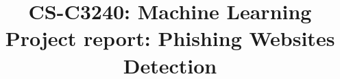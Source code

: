 \documentclass{article}
\title{CS-C3240: Machine Learning\\
    \large Project report: Phishing Websites Detection}
\newcommand{\inlinemaketitle}{{\let\newpage\relax\maketitle}}
\begin{document}
\inlinemaketitle


% 
% 

% 


% 
% 

\printbibliography[heading=bibintoc]

\begin{appendix}
    
\end{appendix}
\end{document}
